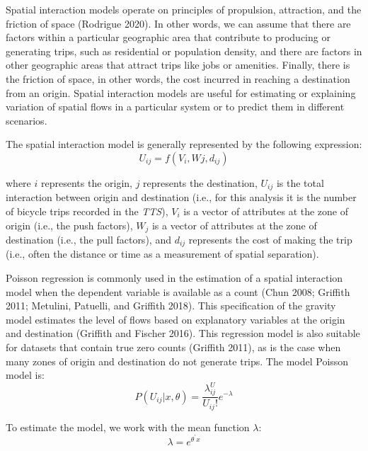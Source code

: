 \documentclass[smallextended]{svjour3}       %
\begin{document}
Spatial interaction models operate on principles of propulsion,
attraction, and the friction of space (Rodrigue 2020). In other words,
we can assume that there are factors within a particular geographic area
that contribute to producing or generating trips, such as residential or
population density, and there are factors in other geographic areas that
attract trips like jobs or amenities. Finally, there is the friction of
space, in other words, the cost incurred in reaching a destination from
an origin. Spatial interaction models are useful for estimating or
explaining variation of spatial flows in a particular system or to
predict them in different scenarios.

The spatial interaction model is generally represented by the following
expression: \begin{equation}
\label{eq:interaction-model}
U_{ij} = f(V_i, Wj, d_{ij})
\end{equation}

\noindent where \(i\) represents the origin, \(j\) represents the
destination, \(U_{ij}\) is the total interaction between origin and
destination (i.e., for this analysis it is the number of bicycle trips
recorded in the \emph{TTS}), \(V_i\) is a vector of attributes at the
zone of origin (i.e., the push factors), \(W_j\) is a vector of
attributes at the zone of destination (i.e., the pull factors), and
\(d_{ij}\) represents the cost of making the trip (i.e., often the
distance or time as a measurement of spatial separation).

Poisson regression is commonly used in the estimation of a spatial
interaction model when the dependent variable is available as a count
(Chun 2008; Griffith 2011; Metulini, Patuelli, and Griffith 2018). This
specification of the gravity model estimates the level of flows based on
explanatory variables at the origin and destination (Griffith and
Fischer 2016). This regression model is also suitable for datasets that
contain true zero counts (Griffith 2011), as is the case when many zones
of origin and destination do not generate trips. The model Poisson model
is: \begin{equation}
\label{eq:poisson-model}
P(U_{ij}|x,\theta) = \frac{\lambda^U_{ij}}{U_{ij}!}e^{-\lambda} 
\end{equation}

To estimate the model, we work with the mean function \(\lambda\):
\begin{equation}
\label{eq:mean-function}
\lambda = e^{\theta^\prime x} 
\end{equation}
\end{document}
